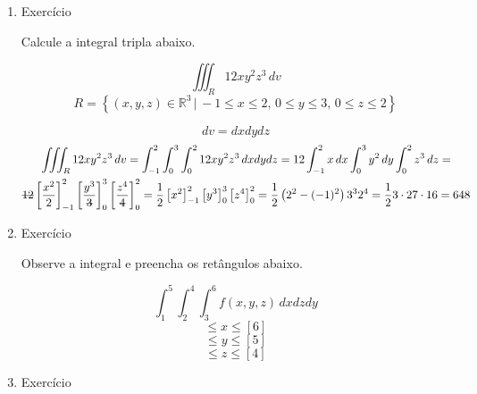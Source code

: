 \begin{enumerate}
	\item Exercício
	
	Calcule a integral tripla abaixo.
	
	\begin{equation*}
		\iiint_R 12xy^2z^3\,dv
	\end{equation*}
	\begin{equation*}
		R = \left\{(x, y, z) \in \mathbb{R}^3 \,|\, -1 \leq x \leq 2,\, 0 \leq y \leq 3,\, 0 \leq z \leq 2\right\}
	\end{equation*}
	
	\begin{equation*}
		dv = dxdydz
	\end{equation*}
	\begin{gather*}
		\iiint_R 12xy^2z^3\,dv = \int_{-1}^2 \int_0^3 \int_0^2 12xy^2z^3\, dxdydz = 12\int_{-1}^2 x\, dx \int_0^3 y^2\, dy \int_0^2 z^3\, dz =\\ {\overstrike{12}}\left[\dfrac{x^2}{2}\right]_{-1}^2 \left[\dfrac{y^3}{\overstrike{3}}\right]_0^3 \left[\dfrac{z^4}{\overstrike{4}}\right]_0^2 = \dfrac{1}{2}\left[x^2\right]_{-1}^2 \left[y^3\right]_0^3 \left[z^4\right]_0^2 = \dfrac{1}{2}\left(2^2 - (-1)^2\right)3^3 2^4 = \dfrac{1}{2}3\cdot27\cdot16 = 648
	\end{gather*}
	
	\item Exercício
	
	Observe a integral e preencha os retângulos abaixo.
	
	\begin{equation*}
		\int_1^5 \int_2^4 \int_3^6 f(x,y,z)\, dxdzdy	
	\end{equation*}
	\begin{equation*}
		[3] \leq x \leq [6]
	\end{equation*}
	\begin{equation*}
		[1] \leq y \leq [5]
	\end{equation*}
	\begin{equation*}
		[2] \leq z \leq [4]
	\end{equation*}
	
	\item Exercício
	

\end{enumerate}
